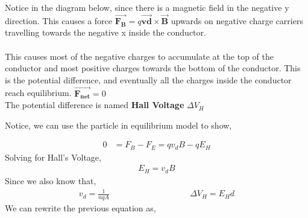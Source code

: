 \documentclass[12pt, titlepage, oneside]{article}
\let\oldvec\vec
\renewcommand{\vec}[1]{\oldvec{\bm{#1}}}
\begin{document}
Notice in the diagram below, since there is a magnetic field in the negative y direction. This causes a force $\vec{F_B} = q\vec{vd}\times\vec{B}$ upwards on negative charge carriers travelling towards the negative x inside the conductor. 
\\\\
This causes most of the negative charges to accumulate at the top of the conductor and most positive charges towards the bottom of the conductor. This is the potential difference, and eventually all the charges inside the conductor reach equilibrium. $\vec{F_{net}} = 0$ 
\\

The potential difference is named \textbf{Hall Voltage} $\Delta V_H$ 

Notice, we can use the particle in equilibrium model to show,

\begin{align*}
0 &= F_B - F_E = qv_dB - q E_H
\end{align*}
Solving for Hall's Voltage, 
\begin{align*}
E_H = v_d B
\end{align*}
Since we also know that,
\begin{align*}
v_d = \frac{1}{nqA}\hspace{4cm}
\Delta V_H = E_H d
\end{align*}
We can rewrite the previous equation as,\\

	\noindent{}
\end{document}
